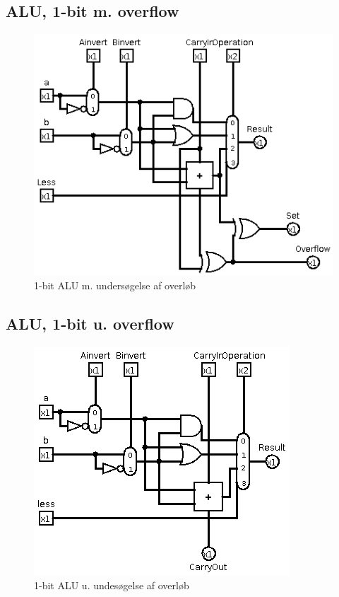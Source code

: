 \documentclass[10pt,a4paper,danish]{article}
\begin{document}
\subsection{ALU, 1-bit m. overflow}
\begin{figure}[htb]
\begin{center}
\leavevmode
\includegraphics[scale=0.70]{alu-1bit-overflow.png}
\end{center}
\caption{1-bit ALU m. undersøgelse af overløb}
\label{fig:alu-1bit}
\end{figure}

\subsection{ALU, 1-bit u. overflow}
\begin{figure}[htb]
\begin{center}
\leavevmode
\includegraphics[scale=0.70]{alu-1bit.png}
\end{center}
\caption{1-bit ALU u. undesøgelse af overløb}
\label{fig:alu-1bit}
\end{figure}
\end{document}
